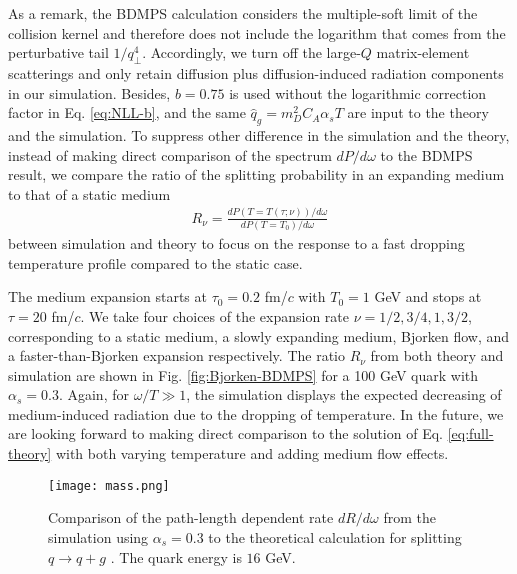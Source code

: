 As a remark, the BDMPS calculation considers the multiple-soft limit of the collision kernel and therefore does not include the logarithm that comes from the perturbative tail $1/q_\perp^4$. 
Accordingly, we turn off the large-$Q$ matrix-element scatterings and only retain diffusion plus diffusion-induced radiation components in our simulation.
Besides, $b=0.75$ is used without the logarithmic correction factor in Eq. \ref{eq:NLL-b}, and the same $\hat{q}_g = m_D^2 C_A\alpha_s T$ are input to the theory and the simulation.
To suppress other difference in the simulation and the theory, instead of making direct comparison of the spectrum $dP/d\omega$ to the BDMPS result, we compare the ratio of the splitting probability in an expanding medium to that of a static medium
\begin{eqnarray}
R_\nu = \frac{dP(T=T(\tau;\nu))/d\omega}{dP(T=T_0)/d\omega}
\end{eqnarray}
between simulation and theory to focus on the response to a fast dropping temperature profile compared to the static case.

The medium expansion starts at $\tau_0=0.2$ fm/$c$ with $T_0=1$ GeV and stops at $\tau = 20$ fm/$c$.
We take four choices of the expansion rate $\nu = 1/2, 3/4, 1, 3/2$, corresponding to a static medium, a slowly expanding medium, Bjorken flow, and a faster-than-Bjorken expansion respectively.
The ratio $R_\nu$ from both theory and simulation are shown in Fig. \ref{fig:Bjorken-BDMPS} for a 100 GeV quark with $\alpha_s=0.3$.
Again, for $\omega/T \gg 1$, the simulation displays the expected decreasing of medium-induced radiation due to the dropping of temperature.
In the future, we are looking forward to making direct comparison to the solution of Eq. \ref{eq:full-theory} with both varying temperature and adding medium flow effects.

\begin{figure}
\texttt{[image: mass.png]}
\caption{Comparison of the path-length dependent rate $dR/d\omega$ from the simulation using $\alpha_s = 0.3$ to the theoretical calculation for splitting $q\rightarrow q+g$ \cite{CaronHuot:2010bp}. The quark energy is $16$ GeV.}
\label{fig:spectra-L-alphas=0.3}
\end{figure}


